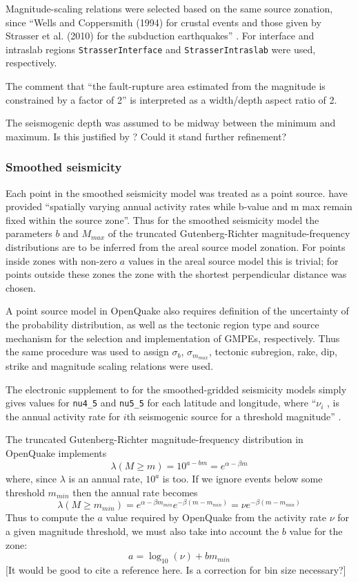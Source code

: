 \documentclass{article}
\begin{document}
Magnitude-scaling relations were selected based on the same source zonation, since ``Wells and Coppersmith (1994) for crustal events and those given by
Strasser et al. (2010) for the subduction earthquakes'' \citep[p.~140]{nath2012probabilistic}. For interface and intraslab regions \texttt{StrasserInterface} and \texttt{StrasserIntraslab} were used, respectively. 

The comment that ``the fault-rupture area estimated from the magnitude is constrained by a factor of 2'' \citep[p.~140]{nath2012probabilistic} is interpreted as a width/depth aspect ratio of 2.

The seismogenic depth was assumed to be midway between the minimum and maximum. Is this justified by \cite{thingbaijam2011seismogenic}? Could it stand further refinement?


\subsubsection{Smoothed seismicity}
\label{sec:Smoothed}

Each point in the smoothed seismicity model was treated as a point source. \cite{nath2012probabilistic} have provided ``spatially varying annual activity rates while b-value and m max remain fixed within the source zone''. Thus for the smoothed seismicity model the parameters $b$ and $M_{max}$ of the truncated Gutenberg-Richter magnitude-frequency distributions are to be inferred from the areal source model zonation. For points inside zones with non-zero $a$ values in the areal source model this is trivial; for points outside these zones the zone with the shortest perpendicular distance was chosen.

A point source model in OpenQuake also requires definition of the uncertainty of the probability distribution, as well as the tectonic region type and source mechanism for the selection and implementation of GMPEs, respectively. Thus the same procedure was used to assign $\sigma_b$, $\sigma_{m_{max}}$, tectonic subregion, rake, dip, strike and magnitude scaling relations were used.

The electronic supplement to \cite{nath2012probabilistic} for the smoothed-gridded seismicity models simply gives values for \texttt{nu4\_5} and \texttt{nu5\_5} for each latitude and longitude, where ``$\nu_i$ , is the annual activity rate for $i$th seismogenic source for a threshold magnitude'' \cite[p.~140]{nath2012probabilistic}.

The truncated Gutenberg-Richter magnitude-frequency distribution in OpenQuake implements
$$\lambda(M \geq m) = 10^{a - b m} = e^{\alpha - \beta m}$$
where, since $\lambda$ is an annual rate, $10^a$ is too. If we ignore events below some threshold $m_{min}$ then the annual rate becomes
$$\lambda(M \geq m_{min}) = e^{\alpha - \beta m_{min}} e^{-\beta (m - m_{min})} = \nu e^{-\beta (m - m_{min})} $$
Thus to compute the $a$ value required by OpenQuake from the activity rate $\nu$ for a given magnitude threshold, we must also take into account the $b$ value for the zone:
$$a = \log_{10}(\nu) + b m_{min}$$
[It would be good to cite a reference here. Is a correction for bin size necessary?]
\end{document}
